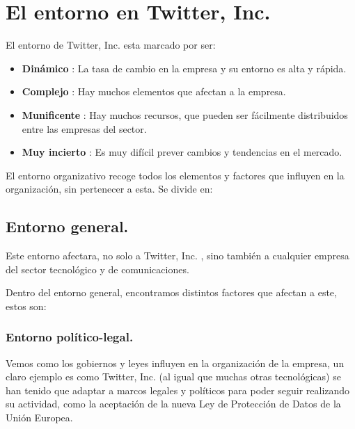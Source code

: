 \newpage


\section{El entorno en Twitter, Inc.}

El entorno de Twitter, Inc. esta marcado por ser:

\begin{itemize}

\item \textbf{Dinámico} : La tasa de cambio en la empresa y su entorno es alta y rápida.

\item \textbf{Complejo} : Hay muchos elementos que afectan a la empresa.

\item \textbf{Munificente} : Hay muchos recursos, que pueden ser fácilmente distribuidos entre las empresas del sector.

\item \textbf{Muy incierto} : Es muy difícil prever cambios y tendencias en el mercado.

\end{itemize}

El entorno organizativo recoge todos los elementos y factores que influyen en la organización, sin pertenecer a esta. Se divide en:

\subsection{Entorno general.}

Este entorno afectara, no solo a Twitter, Inc. , sino también a cualquier empresa del sector tecnológico y de comunicaciones.

Dentro del entorno general, encontramos distintos factores que afectan a este, estos son:

\subsubsection{Entorno político-legal.}

Vemos como los gobiernos y leyes influyen en la organización de la empresa, un claro ejemplo es como Twitter, Inc. (al igual que muchas otras tecnológicas) se han tenido que adaptar a marcos legales y políticos para poder seguir realizando su actividad, como la aceptación de la nueva Ley de Protección de Datos de la Unión Europea.

